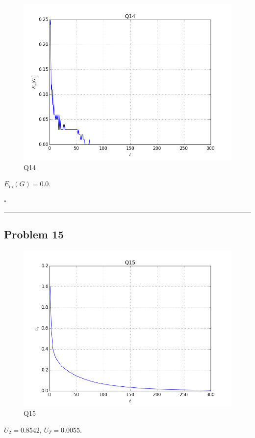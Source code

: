 \documentclass[12pt]{article}
\newcommand*{\QEDB}{\hfill\ensuremath{\square}}
\newcommand{\ParTh}[1]{\left(#1\right)}
\newcommand{\horrule}[1]{\rule{\linewidth}{#1}}
\begin{document}
\begin{figure}[H]
	\centering
	\includegraphics[scale=0.5]{Q14.png}
	\caption{Q14}
	\label{Q14}
\end{figure}
$E_{\text{in}}\ParTh{G}=0.0$.

\QEDB

\horrule{0.5pt}

\subsection*{Problem 15}

\begin{figure}[H]
	\centering
	\includegraphics[scale=0.5]{Q15.png}
	\caption{Q15}
	\label{Q15}
\end{figure}
$U_2=0.8542$, $U_T=0.0055$.
\end{document}
